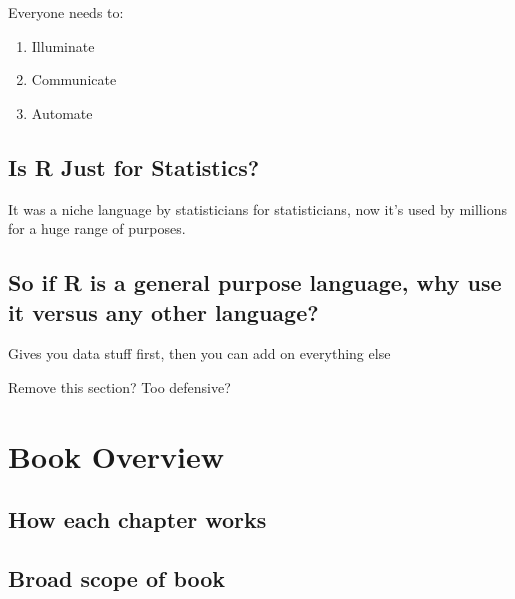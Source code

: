 \documentclass[
]{book}
\providecommand{\tightlist}{%
  \setlength{\itemsep}{0pt}\setlength{\parskip}{0pt}}
\begin{document}
Everyone needs to:

\begin{enumerate}
\def\labelenumi{\arabic{enumi}.}
\tightlist
\item
  Illuminate
\item
  Communicate
\item
  Automate
\end{enumerate}

\hypertarget{is-r-just-for-statistics}{%
\subsection*{Is R Just for Statistics?}\label{is-r-just-for-statistics}}

It was a niche language by statisticians for statisticians, now it's used by millions for a huge range of purposes.

\hypertarget{so-if-r-is-a-general-purpose-language-why-use-it-versus-any-other-language}{%
\subsection*{So if R is a general purpose language, why use it versus any other language?}\label{so-if-r-is-a-general-purpose-language-why-use-it-versus-any-other-language}}

Gives you data stuff first, then you can add on everything else

Remove this section? Too defensive?

\hypertarget{book-overview}{%
\section*{Book Overview}\label{book-overview}}

\hypertarget{how-each-chapter-works}{%
\subsection*{How each chapter works}\label{how-each-chapter-works}}

\hypertarget{broad-scope-of-book}{%
\subsection*{Broad scope of book}\label{broad-scope-of-book}}
\end{document}
